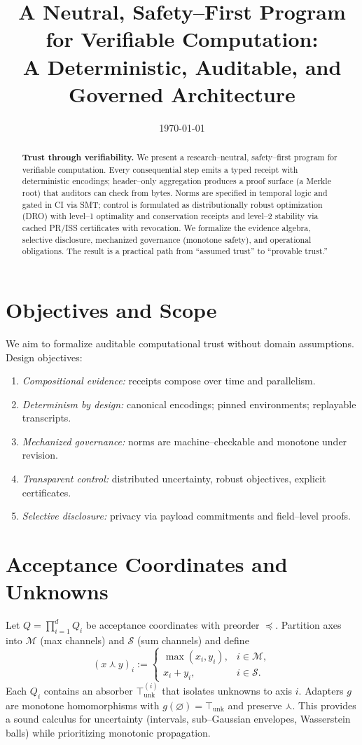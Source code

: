 \documentclass[11pt]{article}
\title{\vspace{-8pt}A Neutral, Safety--First Program for Verifiable Computation:\\
A Deterministic, Auditable, and Governed Architecture}
\author{}
\date{\today}
\theoremstyle{plain}
\theoremstyle{definition}
\theoremstyle{remark}
\begin{document}
\maketitle

\begin{abstract}
\noindent \textbf{Trust through verifiability.} We present a research--neutral, safety--first program for verifiable computation. Every consequential step emits a typed receipt with deterministic encodings; header--only aggregation produces a proof surface (a Merkle root) that auditors can check from bytes. Norms are specified in temporal logic and gated in CI via SMT; control is formulated as distributionally robust optimization (DRO) with level--1 optimality and conservation receipts and level--2 stability via cached PR/ISS certificates with revocation. We formalize the evidence algebra, selective disclosure, mechanized governance (monotone safety), and operational obligations. The result is a practical path from ``assumed trust'' to ``provable trust.''
\end{abstract}

\section{Objectives and Scope}
We aim to formalize auditable computational trust without domain assumptions. Design objectives:
\begin{enumerate}[label=\textbf{O\arabic*}.]
  \item \emph{Compositional evidence:} receipts compose over time and parallelism.
  \item \emph{Determinism by design:} canonical encodings; pinned environments; replayable transcripts.
  \item \emph{Mechanized governance:} norms are machine--checkable and monotone under revision.
  \item \emph{Transparent control:} distributed uncertainty, robust objectives, explicit certificates.
  \item \emph{Selective disclosure:} privacy via payload commitments and field--level proofs.
\end{enumerate}

\section{Acceptance Coordinates and Unknowns}
Let $Q=\prod_{i=1}^d Q_i$ be acceptance coordinates with preorder $\preceq$. Partition axes into $\mathcal{M}$ (max channels) and $\mathcal{S}$ (sum channels) and define
\begin{equation*}
(x\curlywedge y)_i := \begin{cases}
\max(x_i,y_i), & i\in\mathcal{M},\\
x_i+y_i, & i\in\mathcal{S}.
\end{cases}
\end{equation*}
Each $Q_i$ contains an absorber $\top^{(i)}_{\mathrm{unk}}$ that isolates unknowns to axis $i$. Adapters $g$ are monotone homomorphisms with $g(\varnothing)=\top_{\mathrm{unk}}$ and preserve $\curlywedge$. This provides a sound calculus for uncertainty (intervals, sub--Gaussian envelopes, Wasserstein balls) while prioritizing monotonic propagation.
\end{document}
